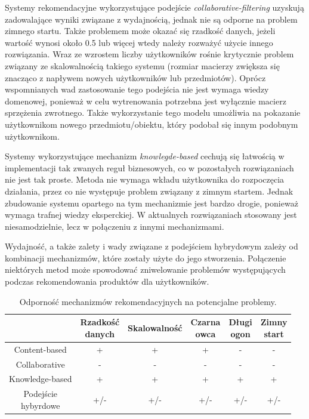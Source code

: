 Systemy rekomendacyjne wykorzystujące podejście \textit{collaborative-filtering} uzyskują zadowalające wyniki związane z wydajnością, jednak nie są odporne na problem zimnego startu. Także problemem może okazać się rzadkość danych, jeżeli wartość wynosi około 0.5 lub więcej wtedy należy rozważyć użycie innego rozwiązania. Wraz ze wzrostem liczby użytkowników rośnie krytycznie problem związany ze skalowalnością takiego systemu (rozmiar macierzy zwiększa się znacząco z napływem nowych użytkowników lub przedmiotów). Oprócz wspomnianych wad zastosowanie tego podejścia nie jest wymaga wiedzy domenowej, ponieważ w celu wytrenowania potrzebna jest wyłącznie macierz sprzężenia zwrotnego. Także wykorzystanie tego modelu umożliwia na pokazanie użytkownikom nowego przedmiotu/obiektu, który podobał się innym podobnym użytkownikom.

Systemy wykorzystujące mechanizm \textit{knowlegde-based} cechują się łatwością w implementacji tak zwanych reguł biznesowych, co w pozostałych rozwiązaniach nie jest tak proste. Metoda nie wymaga wkładu użytkownika do rozpoczęcia działania, przez co nie występuje problem związany z zimnym startem. Jednak zbudowanie systemu opartego na tym mechanizmie jest bardzo drogie, ponieważ wymaga trafnej wiedzy eksperckiej. W aktualnych rozwiązaniach stosowany jest niesamodzielnie, lecz w połączeniu z innymi mechanizmami. \cite{reviewCurrentRS}

Wydajność, a także zalety i wady związane z podejściem hybrydowym zależy od kombinacji mechanizmów, które zostały użyte do jego stworzenia. Połączenie niektórych metod może spowodować zniwelowanie problemów występujących podczas rekomendowania produktów dla użytkowników.

\begin{table}[h]
\centering
\caption{Odporność mechanizmów rekomendacyjnych na potencjalne problemy.}
\begin{tabular}{|c|c|c|c|c|c|}
\hline
&
\specialcell{Rzadkość\\danych} &
Skalowalność &
\specialcell{Czarna\\owca} &
\specialcell{Długi\\ogon} &
\specialcell{Zimny\\start}
\\
\hline
  
Content-based &
+ &
+ &
+ &
- &
-
\\
\hline
  
Collaborative &
- &
- &
- &
- &
-
\\
\hline

Knowledge-based &
+ &
+ &
+ &
+ &
+
\\
\hline

\specialcell{Podejście\\hybyrdowe} &
+/- &
+/- &
+/- &
+/- &
+/-
\\
\hline
\end{tabular} 
\label{tabelaMetProblem}
\end{table}
